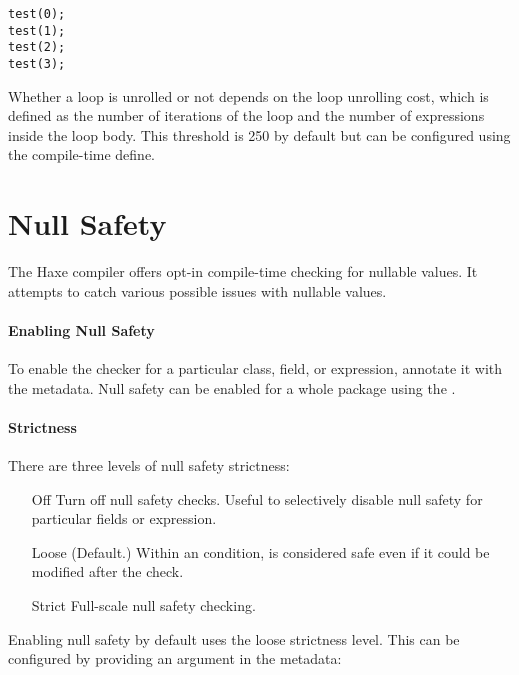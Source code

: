 \begin{lstlisting}
test(0);
test(1);
test(2);
test(3);
\end{lstlisting}

Whether a loop is unrolled or not depends on the loop unrolling cost, which is defined as the number of iterations of the loop and the number of expressions inside the loop body. This threshold is 250 by default but can be configured using the  compile-time define.


\section{Null Safety}
\label{cr-null-safety}

The Haxe compiler offers opt-in compile-time checking for nullable values. It attempts to catch various possible issues with nullable values.

\paragraph{Enabling Null Safety}

To enable the checker for a particular class, field, or expression, annotate it with the  metadata. Null safety can be enabled for a whole package using the  .

\paragraph{Strictness}

There are three levels of null safety strictness:

\begin{itemize}
    \item[Off] Turn off null safety checks. Useful to selectively disable null safety for particular fields or expression.
    \item[Loose] (Default.) Within an  condition,  is considered safe even if it could be modified after the check.
    \item[Strict] Full-scale null safety checking.
\end{itemize}

Enabling null safety by default uses the loose strictness level. This can be configured by providing an argument in the metadata:


